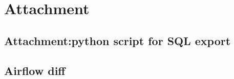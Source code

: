 \documentclass[a4paper,12pt,oneside]{report}
\renewcommand*\thesection{\arabic{section}}
\begin{document}
\setcounter{footnote}{1}
\newpage

\appendix
\chapter*{Attachment}

\renewcommand\thesection{\Alph{section}}

\section{Attachment:python script for SQL export}
\section{Airflow diff}\label{airflow_diff}
\end{document}

